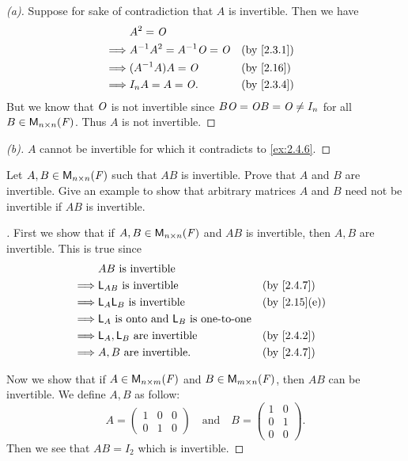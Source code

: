 \begin{proof}[(a)]
  Suppose for sake of contradiction that \(A\) is invertible.
  Then we have
  \begin{align*}
             & A^2 = \zm                                     \\
    \implies & A^{-1} A^2 = A^{-1} \zm = \zm &  & \by{2.3.1} \\
    \implies & (A^{-1} A) A = \zm            &  & \by{2.16}  \\
    \implies & I_n A = A = \zm.              &  & \by{2.3.4}
  \end{align*}
  But we know that \(\mathit{O}\) is not invertible since \(B \mathit{O} = \mathit{O} B = \mathit{O} \neq I_n\) for all \(B \in \ms[n][n][\F]\).
  Thus \(A\) is not invertible.
\end{proof}

\begin{proof}[(b)]
  \(A\) cannot be invertible for which it contradicts to \cref{ex:2.4.6}.
\end{proof}

\setcounter{ex}{8}
\begin{ex}\label{ex:2.4.9}
  Let \(A, B \in \ms[n][n][\F]\) such that \(AB\) is invertible.
  Prove that \(A\) and \(B\) are invertible.
  Give an example to show that arbitrary matrices \(A\) and \(B\) need not be invertible if \(AB\) is invertible.
\end{ex}

\begin{proof}[]
  First we show that if \(A, B \in \ms[n][n][\F]\) and \(AB\) is invertible, then \(A, B\) are invertible.
  This is true since
  \begin{align*}
             & AB \text{ is invertible}                                               \\
    \implies & \L_{AB} \text{ is invertible}                        &  & \by{2.4.7}   \\
    \implies & \L_A \L_B \text{ is invertible}                      &  & \by{2.15}[e] \\
    \implies & \L_A \text{ is onto and } \L_B \text{ is one-to-one}                   \\
    \implies & \L_A, \L_B \text{ are invertible}                    &  & \by{2.4.2}   \\
    \implies & A, B \text{ are invertible}.                         &  & \by{2.4.7}
  \end{align*}

  Now we show that if \(A \in \ms[n][m][\F]\) and \(B \in \ms\), then \(AB\) can be invertible.
  We define \(A, B\) as follow:
  \[
    A = \begin{pmatrix}
      1 & 0 & 0 \\
      0 & 1 & 0
    \end{pmatrix} \quad \text{and} \quad B = \begin{pmatrix}
      1 & 0 \\
      0 & 1 \\
      0 & 0
    \end{pmatrix}.
  \]
  Then we see that \(AB = I_2\) which is invertible.
\end{proof}

